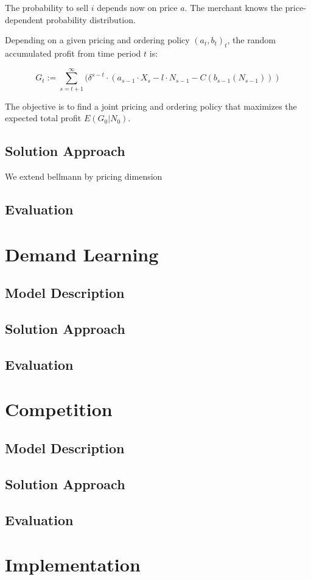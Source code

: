 The probability to sell $i$ depends now on price $a$.
The merchant knows the price-dependent probability distribution.

Depending on a given pricing and ordering policy $(a_t, b_t)_t$, the random accumulated profit from time period $t$ is:

$$
G_t := \sum_{s=t+1}^{\infty} (\delta^{s-t} \cdot (a_{s-1} \cdot X_s - l \cdot N_{s-1} - C(b_{s-1}(N_{s-1})))
$$

The objective is to find a joint pricing and ordering policy that maximizes the expected total profit $E(G_0 | N_0)$.

\subsection{Solution Approach}
We extend bellmann by pricing dimension

\subsection{Evaluation}


\section{Demand Learning}
\subsection{Model Description}
\subsection{Solution Approach}
\subsection{Evaluation}

\section{Competition}
\subsection{Model Description}
\subsection{Solution Approach}
\subsection{Evaluation}

\section{Implementation}
